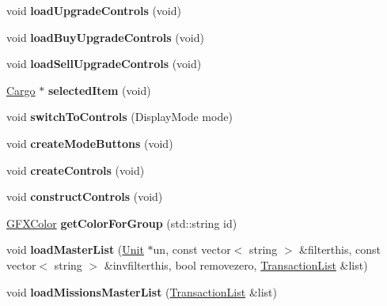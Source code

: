 \begin{DoxyCompactItemize}
\item 
void {\bfseries load\+Upgrade\+Controls} (void)\hypertarget{classBaseComputer_a15c9d7c1c0a7b379a626d3b0b79f1c94}{}\label{classBaseComputer_a15c9d7c1c0a7b379a626d3b0b79f1c94}

\item 
void {\bfseries load\+Buy\+Upgrade\+Controls} (void)\hypertarget{classBaseComputer_a63aee2005518d0c0d8f0117760a69345}{}\label{classBaseComputer_a63aee2005518d0c0d8f0117760a69345}

\item 
void {\bfseries load\+Sell\+Upgrade\+Controls} (void)\hypertarget{classBaseComputer_a28d4ca790825dc8f234d9355e3cabe6b}{}\label{classBaseComputer_a28d4ca790825dc8f234d9355e3cabe6b}

\item 
\hyperlink{classCargo}{Cargo} $\ast$ {\bfseries selected\+Item} (void)\hypertarget{classBaseComputer_a64b15707950676d6927c6ad283fad09d}{}\label{classBaseComputer_a64b15707950676d6927c6ad283fad09d}

\item 
void {\bfseries switch\+To\+Controls} (Display\+Mode mode)\hypertarget{classBaseComputer_a549fd1082bbb4a4f5bb8b1acaa6ef601}{}\label{classBaseComputer_a549fd1082bbb4a4f5bb8b1acaa6ef601}

\item 
void {\bfseries create\+Mode\+Buttons} (void)\hypertarget{classBaseComputer_acfd057efb3cce6c4b9afc7da6b038b8b}{}\label{classBaseComputer_acfd057efb3cce6c4b9afc7da6b038b8b}

\item 
void {\bfseries create\+Controls} (void)\hypertarget{classBaseComputer_ac6d733e909b5d1888ece62aa5854904b}{}\label{classBaseComputer_ac6d733e909b5d1888ece62aa5854904b}

\item 
void {\bfseries construct\+Controls} (void)\hypertarget{classBaseComputer_af9a09bcfe22916238a109aa1aa9525d4}{}\label{classBaseComputer_af9a09bcfe22916238a109aa1aa9525d4}

\item 
\hyperlink{structGFXColor}{G\+F\+X\+Color} {\bfseries get\+Color\+For\+Group} (std\+::string id)\hypertarget{classBaseComputer_ac2894f89ad578a5fedce6863756b9e10}{}\label{classBaseComputer_ac2894f89ad578a5fedce6863756b9e10}

\item 
void {\bfseries load\+Master\+List} (\hyperlink{classUnit}{Unit} $\ast$un, const vector$<$ string $>$ \&filterthis, const vector$<$ string $>$ \&invfilterthis, bool removezero, \hyperlink{structBaseComputer_1_1TransactionList}{Transaction\+List} \&list)\hypertarget{classBaseComputer_abdd1f7b98a60587511eaa69b0b5d5d93}{}\label{classBaseComputer_abdd1f7b98a60587511eaa69b0b5d5d93}

\item 
void {\bfseries load\+Missions\+Master\+List} (\hyperlink{structBaseComputer_1_1TransactionList}{Transaction\+List} \&list)\hypertarget{classBaseComputer_a149395e44842d01524f083a3e254484a}{}\label{classBaseComputer_a149395e44842d01524f083a3e254484a}

\end{DoxyCompactItemize}
